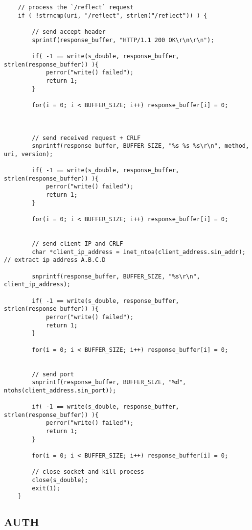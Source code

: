 \begin{lstlisting}
    // process the `/reflect` request
    if ( !strncmp(uri, "/reflect", strlen("/reflect")) ) {

        // send accept header
        sprintf(response_buffer, "HTTP/1.1 200 OK\r\n\r\n");

        if( -1 == write(s_double, response_buffer, strlen(response_buffer)) ){
            perror("write() failed");
            return 1;
        }

        for(i = 0; i < BUFFER_SIZE; i++) response_buffer[i] = 0;



        // send received request + CRLF
        snprintf(response_buffer, BUFFER_SIZE, "%s %s %s\r\n", method, uri, version);

        if( -1 == write(s_double, response_buffer, strlen(response_buffer)) ){
            perror("write() failed");
            return 1;
        }

        for(i = 0; i < BUFFER_SIZE; i++) response_buffer[i] = 0;
     

        // send client IP and CRLF
        char *client_ip_address = inet_ntoa(client_address.sin_addr);       // extract ip address A.B.C.D

        snprintf(response_buffer, BUFFER_SIZE, "%s\r\n", client_ip_address);

        if( -1 == write(s_double, response_buffer, strlen(response_buffer)) ){
            perror("write() failed");
            return 1;
        }

        for(i = 0; i < BUFFER_SIZE; i++) response_buffer[i] = 0;


        // send port
        snprintf(response_buffer, BUFFER_SIZE, "%d", ntohs(client_address.sin_port));

        if( -1 == write(s_double, response_buffer, strlen(response_buffer)) ){
            perror("write() failed");
            return 1;
        }

        for(i = 0; i < BUFFER_SIZE; i++) response_buffer[i] = 0;

        // close socket and kill process
        close(s_double);
        exit(1);
    }
\end{lstlisting}

\newpage\subsection{AUTH}


